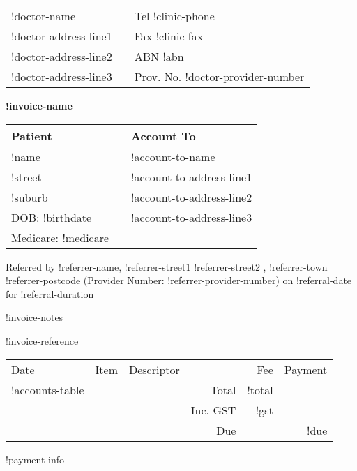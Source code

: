 \documentclass[12pt]{article}
\begin{document}
\begin{center}
\begin{tabular}{p{}>{\centering}p{}<{\centering}p{}<{\raggedleft}}
!doctor-name &  & Tel !clinic-phone \\
!doctor-address-line1 &  & Fax !clinic-fax \\
!doctor-address-line2 & & ABN !abn \\
!doctor-address-line3 & & Prov. No. !doctor-provider-number\\ 
\hline
\end{tabular}

\vspace{7mm}

{ \Large \textbf{!invoice-name} }

\end{center}

\vspace{4mm}


\begin{tabular}{lp{5mm}l} 
Patient & & Account To\\ \midrule
!name & & !account-to-name \\
!street & & !account-to-address-line1 \\
!suburb & & !account-to-address-line2 \\
DOB: !birthdate &  & !account-to-address-line3 \\
Medicare:   !medicare & &   \\
\end{tabular}

\vspace{3mm}

Referred by !referrer-name, !referrer-street1 !referrer-street2 ,
!referrer-town !referrer-postcode (Provider Number: !referrer-provider-number)
on !referral-date for !referral-duration

\vspace{3mm}

!invoice-notes

!invoice-reference

\vspace{3mm}

\begin{tabularx}{\textwidth}{llp{50mm}rrr}
Date & Item & Descriptor & & Fee & Payment \\ \cmidrule(l){1-6}
!accounts-table
\cmidrule(l){5-6}
& & & Total & !total  & \\
& & & Inc. GST & !gst & \\ \cmidrule(l){5-6}
& & & Due & & !due \\

\end{tabularx}

!payment-info
\end{document}
